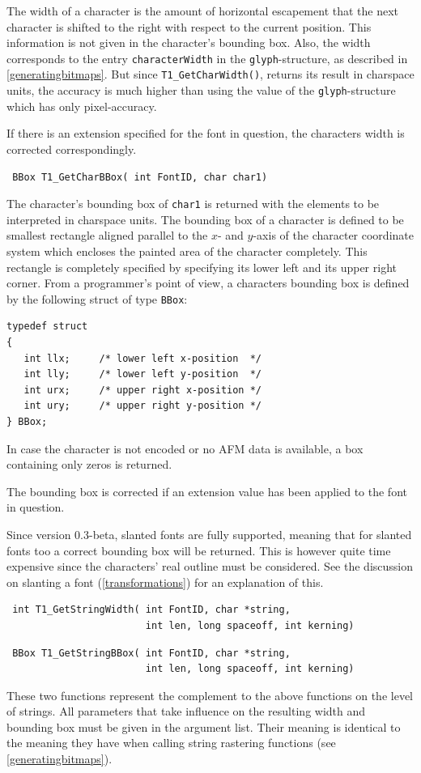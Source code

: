 The width of a
character is the amount of horizontal escapement that the next character is
shifted to the right with respect to the current position. This information is
not given in the character's bounding box. Also, the width corresponds to the
entry \verb+characterWidth+ in the \verb+glyph+-structure, as described in
\ref{generatingbitmaps}. But since \verb+T1_GetCharWidth()+, returns its
result in charspace units, the accuracy is much higher than using the value
of the \verb+glyph+-structure which has only pixel-accuracy.

If there is an extension specified for the font in question, the characters
width is corrected correspondingly. 

\precorr
\begin{verbatim}
 BBox T1_GetCharBBox( int FontID, char char1)
\end{verbatim}\postcorr
The character's bounding box of \verb+char1+ is returned with the elements to
be interpreted in charspace units. The bounding box of a character is defined
to be smallest rectangle aligned parallel to the $x$- and $y$-axis of
the character 
coordinate system which encloses the painted area of the character
completely. This rectangle is completely specified by specifying its
lower left and its upper 
right corner. From a programmer's point of view, a characters bounding
box is defined by the following struct of type \verb+BBox+:
\begin{verbatim}
typedef struct
{ 
   int llx;     /* lower left x-position  */
   int lly;     /* lower left y-position  */
   int urx;     /* upper right x-position */
   int ury;     /* upper right y-position */
} BBox;
\end{verbatim}
In case the character is not encoded or no AFM data is available, a box
containing only zeros is returned.

The bounding box is corrected if an extension value has been applied
to the font in question.

Since version 0.3-beta, slanted fonts are fully supported, meaning that for
slanted fonts too a correct bounding box will be returned. This is however
quite time expensive since the characters' real outline must be considered.
See the discussion on slanting a font  (\ref{transformations}) for an
explanation of this.


\precorr
\begin{verbatim}
 int T1_GetStringWidth( int FontID, char *string,
                        int len, long spaceoff, int kerning)
\end{verbatim}\postcorr
\precorr
\begin{verbatim}
 BBox T1_GetStringBBox( int FontID, char *string,
                        int len, long spaceoff, int kerning)
\end{verbatim}\postcorr
These two functions represent the complement to the above functions on the level
of strings. All parameters that take influence on the resulting width and
bounding box must be given in the argument list. Their meaning is identical to
the meaning they have when calling string rastering functions (see
\ref{generatingbitmaps}). 


